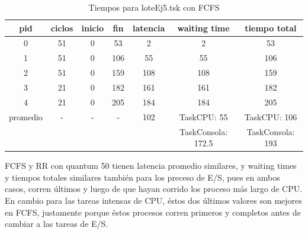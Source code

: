 \begin{table}
\centering
\begin{tabular}{ | c | c | c | c | c | c | c | }
  \hline			
  pid & ciclos & inicio & fin & latencia & waiting time & tiempo total  \\
  \hline
0 & 51 & 0 & 53 & 2 & 2 & 53\\
1 & 51 & 0 & 106 & 55 & 55 & 106\\
2 & 51 & 0 & 159 & 108 & 108 & 159\\
3 & 21 & 0 & 182 & 161 & 161 & 182\\
4 & 21 & 0 & 205 & 184 & 184 & 205\\
  \hline
promedio & - & - & - & 102 & TaskCPU: 55  & TaskCPU: 106 \\
                & &  &  &  & TaskConsola: 172.5  & TaskConsola: 193\\
\hline
\end{tabular}
\caption{Tiempos para loteEj5.tsk con FCFS}\label{tab:ej6FCFS}
\end{table}

FCFS y RR con quantum 50 tienen latencia promedio similares, y waiting times y tiempos totales similares también para los preceso de E/S, pues en ambos casos, corren últimos y luego de que hayan corrido los proceso más largo de CPU. En cambio para las tareas intensas de CPU, éstos dos últimos valores son mejores en FCFS, justamente porque éstos procesos corren primeros y completos antes de cambiar a las tareas de E/S.\par
